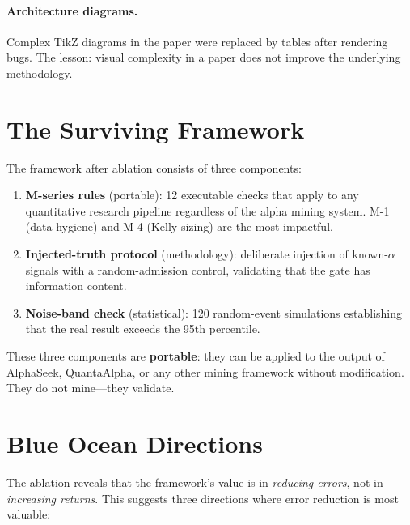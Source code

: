 \documentclass[11pt]{article}
\begin{document}
\paragraph{Architecture diagrams.}
Complex TikZ diagrams in the paper were replaced by tables after rendering
bugs. The lesson: visual complexity in a paper does not improve the
underlying methodology.

\section{The Surviving Framework}

The framework after ablation consists of three components:

\begin{enumerate}
\item \textbf{M-series rules} (portable): 12 executable checks that apply to
  any quantitative research pipeline regardless of the alpha mining system.
  M-1 (data hygiene) and M-4 (Kelly sizing) are the most impactful.
\item \textbf{Injected-truth protocol} (methodology): deliberate injection of
  known-$\alpha$ signals with a random-admission control, validating that the
  gate has information content.
\item \textbf{Noise-band check} (statistical): 120 random-event simulations
  establishing that the real result exceeds the 95th percentile.
\end{enumerate}

These three components are \textbf{portable}: they can be applied to the
output of AlphaSeek, QuantaAlpha, or any other mining framework without
modification. They do not mine---they validate.

\section{Blue Ocean Directions}

The ablation reveals that the framework's value is in \emph{reducing errors},
not in \emph{increasing returns}. This suggests three directions where error
reduction is most valuable:
\end{document}
